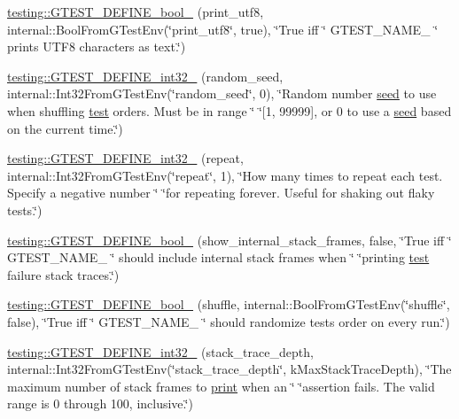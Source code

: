 \begin{DoxyCompactItemize}
\mbox{\hyperlink{namespacetesting_afdae92a76b2682c4d2ff524813bdfedf}{testing\+::\+G\+T\+E\+S\+T\+\_\+\+D\+E\+F\+I\+N\+E\+\_\+bool\+\_\+}} (print\+\_\+utf8, internal\+::\+Bool\+From\+G\+Test\+Env(\char`\"{}print\+\_\+utf8\char`\"{}, true), \char`\"{}True iff \char`\"{} G\+T\+E\+S\+T\+\_\+\+N\+A\+M\+E\+\_\+ \char`\"{} prints U\+T\+F8 characters as text.\char`\"{})
\item 
\mbox{\hyperlink{namespacetesting_a9900d8db2670a26999fbc2a9130f7185}{testing\+::\+G\+T\+E\+S\+T\+\_\+\+D\+E\+F\+I\+N\+E\+\_\+int32\+\_\+}} (random\+\_\+seed, internal\+::\+Int32\+From\+G\+Test\+Env(\char`\"{}random\+\_\+seed\char`\"{}, 0), \char`\"{}Random number \mbox{\hyperlink{_input_8h_af0f2cc4946f88de776f7ffa35e382fcb}{seed}} to use when shuffling \mbox{\hyperlink{_mutual_8h_a707ee03719e99670bf6cfdfd897b8456}{test}} orders.  Must be in range \char`\"{} \char`\"{}\mbox{[}1, 99999\mbox{]}, or 0 to use a \mbox{\hyperlink{_input_8h_af0f2cc4946f88de776f7ffa35e382fcb}{seed}} based on the current time.\char`\"{})
\item 
\mbox{\hyperlink{namespacetesting_aae6f1140f03d7bf24067df0f6628e9ea}{testing\+::\+G\+T\+E\+S\+T\+\_\+\+D\+E\+F\+I\+N\+E\+\_\+int32\+\_\+}} (repeat, internal\+::\+Int32\+From\+G\+Test\+Env(\char`\"{}repeat\char`\"{}, 1), \char`\"{}How many times to repeat each test.  Specify a negative number \char`\"{} \char`\"{}for repeating forever.  Useful for shaking out flaky tests.\char`\"{})
\item 
\mbox{\hyperlink{namespacetesting_a60ef38aa9d1437f0d7818181897af8ef}{testing\+::\+G\+T\+E\+S\+T\+\_\+\+D\+E\+F\+I\+N\+E\+\_\+bool\+\_\+}} (show\+\_\+internal\+\_\+stack\+\_\+frames, false, \char`\"{}True iff \char`\"{} G\+T\+E\+S\+T\+\_\+\+N\+A\+M\+E\+\_\+ \char`\"{} should include internal stack frames when \char`\"{} \char`\"{}printing \mbox{\hyperlink{_mutual_8h_a707ee03719e99670bf6cfdfd897b8456}{test}} failure stack traces.\char`\"{})
\item 
\mbox{\hyperlink{namespacetesting_af95276e3deb9d243d729f3043eabd272}{testing\+::\+G\+T\+E\+S\+T\+\_\+\+D\+E\+F\+I\+N\+E\+\_\+bool\+\_\+}} (shuffle, internal\+::\+Bool\+From\+G\+Test\+Env(\char`\"{}shuffle\char`\"{}, false), \char`\"{}True iff \char`\"{} G\+T\+E\+S\+T\+\_\+\+N\+A\+M\+E\+\_\+ \char`\"{} should randomize tests\textquotesingle{} order on every run.\char`\"{})
\item 
\mbox{\hyperlink{namespacetesting_a84af642630c9181f00fcf0a4a63e795e}{testing\+::\+G\+T\+E\+S\+T\+\_\+\+D\+E\+F\+I\+N\+E\+\_\+int32\+\_\+}} (stack\+\_\+trace\+\_\+depth, internal\+::\+Int32\+From\+G\+Test\+Env(\char`\"{}stack\+\_\+trace\+\_\+depth\char`\"{}, k\+Max\+Stack\+Trace\+Depth), \char`\"{}The maximum number of stack frames to \mbox{\hyperlink{_output_8h_a44e8f67d499345dd94e7d05b8d2e71b9}{print}} when an \char`\"{} \char`\"{}assertion fails.  The valid range is 0 through 100, inclusive.\char`\"{})

\end{DoxyCompactItemize}
